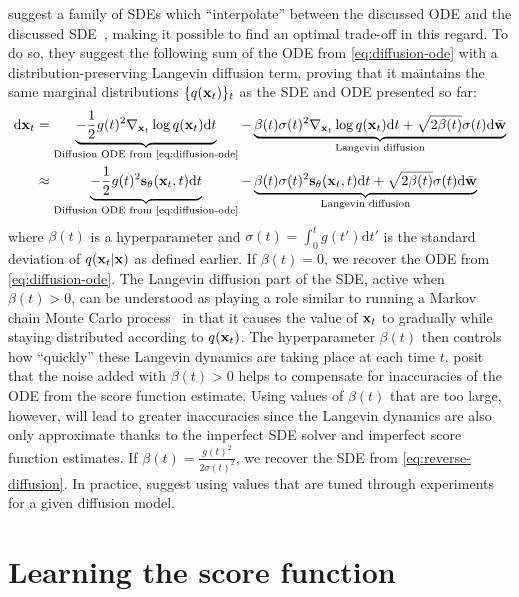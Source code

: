\citet{karras2022elucidating} suggest a family of SDEs which ``interpolate'' between the discussed ODE and the discussed SDE~\citep{karras2022elucidating}, making it possible to find an optimal trade-off in this regard. To do so, they suggest the following sum of the ODE from \cref{eq:diffusion-ode} with a distribution-preserving Langevin diffusion term, proving that it maintains the same marginal distributions $\{q({\mathbf{x}}_t)\}_t$ as the SDE and ODE presented so far:
\begin{align}
    \mathrm{d}{\rvx_t} &= \underbrace{- \frac{1}{2} g(t)^2 \nabla_{\rvx_t} \log q(\rvx_t) \mathrm{d}t}_\text{Diffusion ODE from \cref{eq:diffusion-ode}} - \underbrace{\beta(t) \sigma(t)^2 \nabla_{\rvx_t} \log q(\rvx_t) \mathrm{d}t + \sqrt{2\beta(t)}\sigma(t)\mathrm{d}\bar{\rvw}}_\text{Langevin diffusion}  \label{eq:diffusion-edm-sde-exact} \\
    &\approx \underbrace{- \frac{1}{2} g(t)^2 \rvs_\theta(\rvx_t, t) \mathrm{d}t}_\text{Diffusion ODE from \cref{eq:diffusion-ode}} - \underbrace{\beta(t) \sigma(t)^2 \rvs_\theta(\rvx_t, t) \mathrm{d}t + \sqrt{2\beta(t)}\sigma(t)\mathrm{d}\bar{\rvw}}_\text{Langevin diffusion} \label{eq:diffusion-edm-sde-approx}
\end{align}
where $\beta(t)$ is a hyperparameter and $\sigma(t) = \int_0^t g(t') \mathrm{d}t'$ is the standard deviation of $q({\mathbf{x}}_t|{\mathbf{x}})$ as defined earlier. 
If $\beta(t) = 0$, we recover the ODE from \cref{eq:diffusion-ode}. The Langevin diffusion part of the SDE, active when $\beta(t) > 0$, can be understood as playing a role similar to running a Markov chain Monte Carlo process~\citep{bishop2006pattern} in that it causes the value of ${\mathbf{x}}_t$ to gradually while staying distributed according to $q({\mathbf{x}}_t)$. The hyperparameter $\beta(t)$ then controls how ``quickly'' these Langevin dynamics are taking place at each time $t$. \citet{karras2022elucidating} posit that the noise added with $\beta(t) > 0$ helps to compensate for inaccuracies of the ODE from the score function estimate. Using values of $\beta(t)$ that are too large, however, will lead to greater inaccuracies since the Langevin dynamics are also only approximate thanks to the imperfect SDE solver and imperfect score function estimates. If $\beta(t) = \frac{g(t)^2}{2 \sigma(t)^2}$, we recover the SDE from \cref{eq:reverse-diffusion}. In practice, \citet{karras2022elucidating} suggest using values that are tuned through experiments for a given diffusion model.


\section{Learning the score function} \label{sec:diffusion-training}

